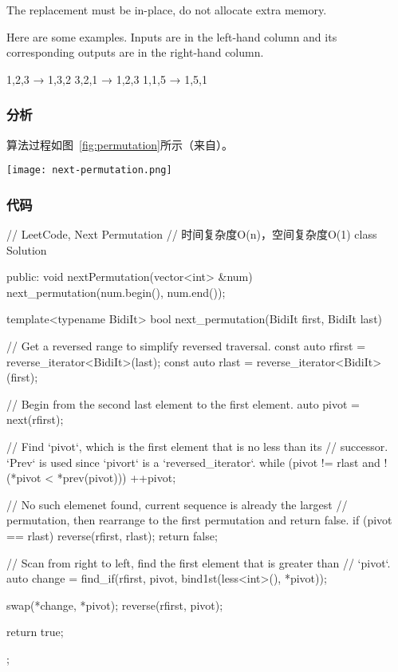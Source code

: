 The replacement must be in-place, do not allocate extra memory.

Here are some examples. Inputs are in the left-hand column and its corresponding outputs are in the right-hand column.
\begin{Code}
1,2,3 → 1,3,2
3,2,1 → 1,2,3
1,1,5 → 1,5,1
\end{Code}


\subsubsection{分析}
算法过程如图~\ref{fig:permutation}所示（来自）。

\begin{center}
\texttt{[image: next-permutation.png]}\\
\label{fig:permutation}
\end{center}


\subsubsection{代码}
\begin{Code}
// LeetCode, Next Permutation
// 时间复杂度O(n)，空间复杂度O(1)
class Solution {
public:
    void nextPermutation(vector<int> &num) {
        next_permutation(num.begin(), num.end());
    }

    template<typename BidiIt>
    bool next_permutation(BidiIt first, BidiIt last) {
        // Get a reversed range to simplify reversed traversal.
        const auto rfirst = reverse_iterator<BidiIt>(last);
        const auto rlast = reverse_iterator<BidiIt>(first);

        // Begin from the second last element to the first element.
        auto pivot = next(rfirst);

        // Find `pivot`, which is the first element that is no less than its
        // successor.  `Prev` is used since `pivort` is a `reversed_iterator`.
        while (pivot != rlast and !(*pivot < *prev(pivot)))
            ++pivot;

        // No such elemenet found, current sequence is already the largest
        // permutation, then rearrange to the first permutation and return false.
        if (pivot == rlast) {
            reverse(rfirst, rlast);
            return false;
        }

        // Scan from right to left, find the first element that is greater than
        // `pivot`.
        auto change = find_if(rfirst, pivot, bind1st(less<int>(), *pivot));

        swap(*change, *pivot);
        reverse(rfirst, pivot);

        return true;
    }
};
\end{Code}


